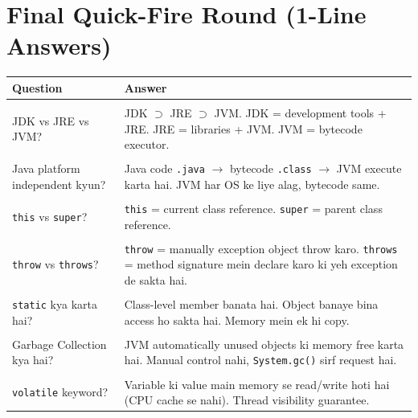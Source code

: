 \documentclass[12pt,a4paper]{article}
\begin{document}
\vspace{1cm}

\section{Final Quick-Fire Round (1-Line Answers)}

\begin{center}
\begin{tcolorbox}[colback=answerbox, colframe=primaryblue, title={\large\bfseries Rapid Fire --- 1-Line Answers}, fonttitle=\color{white}, coltitle=white, width=\textwidth, breakable]

\begin{tabular}{p{7cm} p{7cm}}
\textbf{Question} & \textbf{Answer} \\[5pt]
\hline \\
JDK vs JRE vs JVM? & JDK $\supset$ JRE $\supset$ JVM. JDK = development tools + JRE. JRE = libraries + JVM. JVM = bytecode executor. \\[5pt]
\hline \\
Java platform independent kyun? & Java code \texttt{.java} $\rightarrow$ bytecode \texttt{.class} $\rightarrow$ JVM execute karta hai. JVM har OS ke liye alag, bytecode same. \\[5pt]
\hline \\
\texttt{this} vs \texttt{super}? & \texttt{this} = current class reference. \texttt{super} = parent class reference. \\[5pt]
\hline \\
\texttt{throw} vs \texttt{throws}? & \texttt{throw} = manually exception object throw karo. \texttt{throws} = method signature mein declare karo ki yeh exception de sakta hai. \\[5pt]
\hline \\
\texttt{static} kya karta hai? & Class-level member banata hai. Object banaye bina access ho sakta hai. Memory mein ek hi copy. \\[5pt]
\hline \\
Garbage Collection kya hai? & JVM automatically unused objects ki memory free karta hai. Manual control nahi, \texttt{System.gc()} sirf request hai. \\[5pt]
\hline \\
\texttt{volatile} keyword? & Variable ki value main memory se read/write hoti hai (CPU cache se nahi). Thread visibility guarantee. \\[5pt]

\end{tabular}
\end{tcolorbox}
\end{center}
\end{document}
